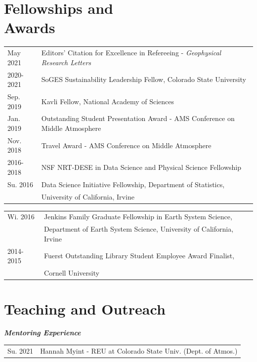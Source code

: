 \documentclass[margin,line,palatino,courier,10pt]{res}
\begin{document}
\begin{resume}
\section{\sc \textcolor{Cerulean}{\large{\textbf{Fellowships and\\ Awards}}}}
\begin{tabular}{@{}p{0.9in}p{4in}}
May 2021 & Editors' Citation for Excellence in Refereeing - \textit{Geophysical Research Letters}\\
2020-2021 & SoGES Sustainability Leadership Fellow, Colorado State University\\
Sep. 2019 & Kavli Fellow, National Academy of Sciences\\
Jan. 2019 & Outstanding Student Presentation Award - AMS Conference on Middle Atmosphere\\
Nov. 2018 & Travel Award - AMS Conference on Middle Atmosphere\\
2016-2018 & NSF NRT-DESE in Data Science and Physical Science Fellowship\\
Su. 2016 & Data Science Initiative Fellowship, Department of Statistics, \\
& University of California, Irvine\\
\end{tabular}
\begin{tabular}{@{}p{0.9in}p{4in}}
Wi. 2016 & Jenkins Family Graduate Fellowship in Earth System Science,\\ 
& Department of Earth System
Science, University of California, Irvine\\
2014-2015 & Fuerst Outstanding Library Student Employee Award Finalist,\\
& Cornell University
\end{tabular}


\vspace{-0.1in}
\noindent\textcolor{Cerulean}{\makebox[\linewidth][r]{\rule{\textwidth}{5pt}}}
\vspace{-0.3in}

\section{\sc \textcolor{Cerulean}{\large{\textbf{Teaching and Outreach}}}}

\textit{\textbf{Mentoring Experience}}
\vspace*{0.05in}\\
\begin{tabular}{@{}p{0.9in}p{4in}}
Su. 2021 & Hannah Myint - REU at Colorado State Univ. (Dept. of Atmos.)
\end{tabular}


\end{resume}
\end{document}
